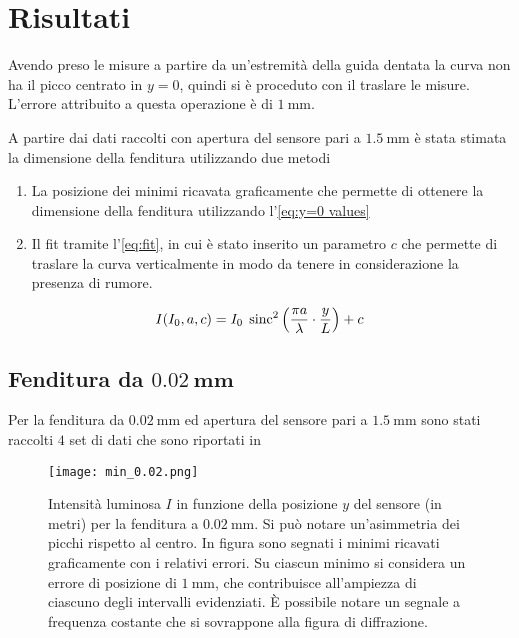 \documentclass[../main.tex]{subfiles}
\begin{document}
\section{Risultati}

Avendo preso le misure a partire da un'estremità della guida dentata la curva non ha il picco centrato in $y = 0$, quindi si è proceduto con il traslare le misure. L'errore attribuito a questa operazione è di $\qty{1}{\mm}$.

A partire dai dati raccolti con apertura del sensore pari a $\qty{1.5}{\mm}$ 
è stata stimata la dimensione della fenditura utilizzando due metodi

\begin{enumerate}
    \item La posizione dei minimi ricavata graficamente che permette di ottenere la dimensione della fenditura utilizzando l'\autoref{eq:y=0 values}
    \item Il fit tramite l'\autoref{eq:fit}, in cui è stato inserito un parametro $c$ che permette di traslare la curva verticalmente in modo da tenere in considerazione la presenza di rumore.
\end{enumerate}

\begin{equation} \label{eq:fit}
    I(I_{0}, a, c) = I_{0} \; \operatorname{sinc}^{2} \left( \frac{\pi a}{\lambda} \cdot \frac{y}{L} \right) + c
\end{equation}

\subsection{Fenditura da $\mathbf{\qty{0.02}{\mm}}$}

Per la fenditura da $\qty{0.02}{\mm}$ ed apertura del sensore pari a $\qty{1.5}{\mm}$ sono stati raccolti $4$ set di dati che sono riportati in %

\begin{figure}[ht!]
    \centering
    \texttt{[image: min\_0.02.png]}
    \caption{Intensità luminosa $I$ in funzione della posizione $y$ del sensore (in metri) per la fenditura a $\qty{0.02}{\milli\metre}$. Si può notare un'asimmetria dei picchi  rispetto al centro. In figura sono segnati i minimi ricavati graficamente con i relativi errori. Su ciascun minimo si considera un errore di posizione di $\qty{1}{\mm}$, che contribuisce all'ampiezza di ciascuno degli intervalli evidenziati. È possibile notare un segnale a frequenza costante che si sovrappone alla figura di diffrazione.} %
    \label{fig:minimi 0.02}
\end{figure}
\end{document}
